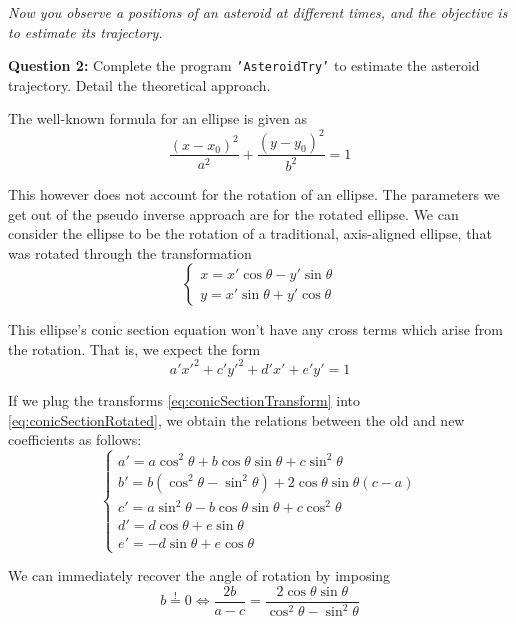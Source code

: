 \textit{Now you observe a positions of an asteroid at different times, and the objective is to estimate its trajectory.}

\textbf{Question 2:} Complete the program \texttt{'AsteroidTry'} to estimate the asteroid trajectory. Detail the theoretical approach.

The well-known formula for an ellipse is given as
\begin{equation}
    \frac{(x - x_0)^2}{a^2} + \frac{(y - y_0)^2}{b^2} = 1
    \label{eq:ellipse}
\end{equation}

This however does not account for the rotation of an ellipse. The parameters we get out of the pseudo inverse approach are for the rotated ellipse. We can consider the ellipse to be the rotation of a traditional, axis-aligned ellipse, that was rotated through the transformation
\begin{equation}
    \begin{cases}
        x = x'\cos\theta - y'\sin\theta \\
        y = x'\sin\theta + y'\cos\theta
    \end{cases}
    \label{eq:conicSectionTransform}
\end{equation}

This ellipse's conic section equation won't have any cross terms which arise from the rotation. That is, we expect the form
\begin{equation}
    a'x'^2 + c'y'^2 + d'x' + e'y' = 1
    \label{eq:conicSectionUnrotated}
\end{equation}

If we plug the transforms \autoref{eq:conicSectionTransform} into \autoref{eq:conicSectionRotated}, we obtain the relations between the old and new coefficients as follows:
\begin{equation}
    \begin{cases}
        a' = a \cos^2\theta + b \cos\theta\sin\theta + c\sin^2\theta \\
        b' = b (\cos^2\theta - \sin^2\theta) + 2\cos\theta\sin\theta (c-a) \\
        c' = a \sin^2\theta - b \cos\theta\sin\theta + c\cos^2\theta \\
        d' = d\cos\theta + e\sin\theta \\
        e' = -d\sin\theta + e\cos\theta 
    \end{cases}
\end{equation}

We can immediately recover the angle of rotation by imposing
\begin{equation}
    b \overset{!}{=} 0 \Leftrightarrow \frac{2b}{a - c} = \frac{2\cos\theta\sin\theta}{\cos^2\theta - \sin^2\theta}
\end{equation}

